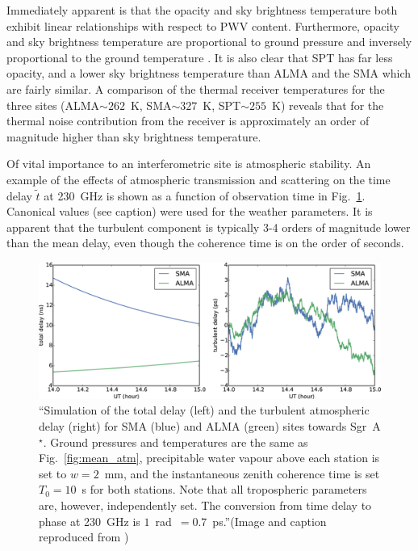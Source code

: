 Immediately apparent is that the opacity and sky brightness temperature both exhibit linear relationships with respect to PWV content. Furthermore, opacity and sky brightness temperature are proportional to ground pressure and inversely proportional to the ground temperature \citep{Pardo_2001}. It is also clear that SPT has far less opacity, and a lower sky brightness temperature than ALMA and the SMA which are fairly similar. A comparison of the thermal receiver temperatures for the three sites  (ALMA$\sim262$~K,  SMA$\sim327$~K, SPT$\sim 255$~K) reveals that for the thermal noise contribution from the receiver is approximately an order of magnitude higher than sky brightness temperature. 



Of vital importance to an interferometric site is atmospheric stability. An example of the effects of atmospheric transmission and scattering on the time delay $\tilde{t}$ at 230~GHz is shown as a function of observation time in Fig.~\ref{delay_plots}. Canonical values (see caption) were used for the weather parameters. It is apparent that the turbulent component is typically 3-4 orders of magnitude lower than the mean delay, even though the coherence time is on the order of seconds.


\begin{figure}[h!]
\includegraphics[width=\columnwidth]{Images/delays}
\caption[Simulation of the total delay and the turbulent atmospheric delay for SMA and ALMA sites towards Sgr~A$^\star$.]{``Simulation of the total delay (left) and the turbulent atmospheric delay (right) for SMA (blue) and ALMA (green) sites towards Sgr~A$^\star$. Ground pressures and temperatures are the same as Fig.~\ref{fig:mean_atm}, precipitable water vapour above each station is set to $w=2$~mm, and the instantaneous zenith coherence time is set $T_0=10$~s for both stations. Note that all tropospheric parameters are, however, independently set. The conversion from time delay to phase at 230~GHz is $1$~rad~$=0.7$~ps.''(Image and caption reproduced from \citet{Blecher_2016})\label{delay_plots}%
}
\end{figure}



